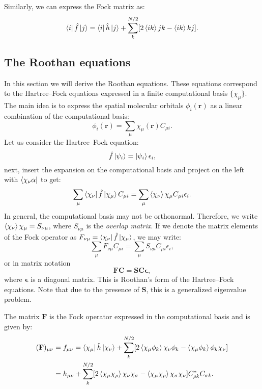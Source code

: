 \documentclass[../Main/chem532-notes.tex]{subfiles}
\begin{document}
Similarly, we can express the Fock matrix as:
\begin{equation}
\bra{i}\hat{f}\ket{j} = \bra{i}\hat{h}\ket{j} + \sum_{k}^{N/2} [ 2 \braket{ik}{jk} - \braket{ik}{kj} ].
\end{equation}

\subsection{The Roothan equations}
In this section we will derive the Roothan equations.
These equations correspond to the Hartree--Fock equations expressed in a finite computational basis $\{ \chi_\mu \}$.
The main idea is to express the spatial molecular orbitals $\phi_i(\mathbf{r})$ as a linear combination of the computational basis:
\begin{equation}
\phi_i(\mathbf{r}) = \sum_{\mu} \chi_\mu(\mathbf{r}) C_{\mu i}.
\end{equation}
Let us consider the Hartree--Fock equation:
\begin{equation}
\hat{f} \ket{\psi_i} = \ket{\psi_i} \epsilon_i,
\end{equation}
next, insert the expansion on the computational basis and project on the left with $\bra{\chi_{\nu} \alpha}$ to get:
\begin{equation}
 \sum_{\mu} \bra{\chi_{\nu}}\hat{f} \ket{\chi_\mu} C_{\mu i} = \sum_{\mu} \braket{\chi_{\nu}}{\chi_\mu} C_{\mu i} \epsilon_i.
\end{equation}
In general, the computational basis may not be orthonormal. Therefore, we write $\braket{\chi_{\nu}}{\chi_\mu} = S_{\nu \mu}$, where $S_{\nu \mu}$ is the \textit{overlap matrix}.
If we denote the matrix elements of the Fock operator as $F_{\nu\mu}=\bra{\chi_{\nu}}\hat{f}\ket{\chi_\mu}$, we may write:
\begin{equation}
 \sum_{\mu} F_{\nu\mu} C_{\mu i} = \sum_{\mu} S_{\nu \mu} C_{\mu i} \epsilon_i,
\end{equation}
or in matrix notation
\begin{equation}
 \mathbf{F}\mathbf{C} = \mathbf{S}\mathbf{C}\boldsymbol{\epsilon},
\end{equation}
where $\boldsymbol{\epsilon}$ is a diagonal matrix.
This is Roothan's form of the Hartree--Fock equations.
Note that due to the presence of $\mathbf{S}$, this is a generalized eigenvalue problem.

The matrix $\mathbf{F}$ is the Fock operator expressed in the computational basis and is given by:
\begin{equation}
\begin{split}
(\mathbf{F})_{\mu\nu} &= f_{\mu\nu}
= \bra{\chi_\mu} \hat{h} \ket{\chi_\nu}
+ \sum_k^{N/2} [ 2 \braket{\chi_\mu \phi_k}{\chi_\nu \phi_k}
- \braket{\chi_\mu \phi_k}{\phi_k \chi_\nu}] \\
&= h_{\mu\nu}
+ \sum_k^{N/2} [ 2 \braket{\chi_\mu \chi_\rho}{\chi_\nu \chi_\sigma} 
- \braket{\chi_\mu \chi_\rho}{\chi_\sigma \chi_\nu }] C_{\rho k}^* C_{\sigma k}.
\end{split}
\end{equation}
\end{document}

